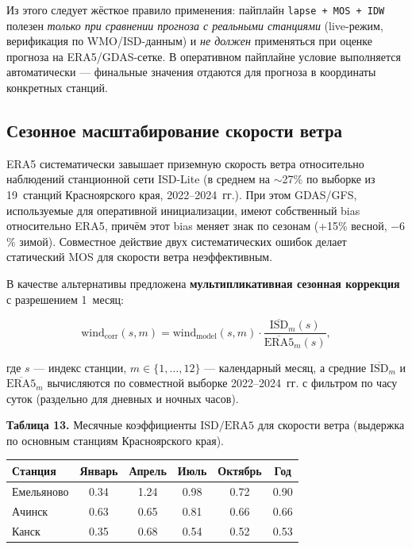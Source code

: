 \documentclass[14pt,a4paper]{extarticle}
\newcounter{none}
\numberwithin{table}{section}
\numberwithin{figure}{section}
\numberwithin{equation}{section}
\begin{document}
Из этого следует жёсткое правило применения: пайплайн
\texttt{lapse + MOS + IDW} полезен \emph{только при сравнении прогноза
с реальными станциями} (live-режим, верификация по WMO/ISD-данным) и
\emph{не должен} применяться при оценке прогноза на ERA5/GDAS-сетке.
В оперативном пайплайне условие выполняется автоматически --- финальные
значения отдаются для прогноза в координаты конкретных станций.

\subsection{Сезонное масштабирование скорости ветра}\label{ux441ux435ux437ux43eux43dux43dux43eux435-ux43cux430ux441ux448ux442ux430ux431ux438ux440ux43eux432ux430ux43dux438ux435-ux432ux435ux442ux440ux430}

ERA5 систематически завышает приземную скорость ветра относительно
наблюдений станционной сети ISD-Lite (в среднем на \(\sim\)27\% по
выборке из 19~станций Красноярского края, 2022--2024~гг.). При этом
GDAS/GFS, используемые для оперативной инициализации, имеют собственный
bias относительно ERA5, причём этот bias меняет знак по сезонам
(+15\% весной, \(-6\)\% зимой). Совместное действие двух систематических
ошибок делает статический MOS для скорости ветра неэффективным.

В качестве альтернативы предложена \textbf{мультипликативная сезонная
коррекция} с разрешением 1~месяц:

\[
\text{wind}_{\text{corr}}(s, m) = \text{wind}_{\text{model}}(s, m) \cdot
\frac{\overline{\text{ISD}}_m(s)}{\overline{\text{ERA5}}_m(s)},
\]

где \(s\) --- индекс станции, \(m \in \{1, \dots, 12\}\) --- календарный
месяц, а средние \(\overline{\text{ISD}}_m\) и
\(\overline{\text{ERA5}}_m\) вычисляются по совместной выборке
2022--2024~гг. с фильтром по часу суток (раздельно для дневных и ночных
часов).

\textbf{Таблица 13.} Месячные коэффициенты \(\text{ISD}/\text{ERA5}\)
для скорости ветра (выдержка по основным станциям Красноярского края).

{\def\LTcaptype{none}
\begin{longtable}[]{@{}lccccc@{}}
\toprule\noalign{}
Станция & Январь & Апрель & Июль & Октябрь & Год \\
\midrule\noalign{}
\endhead
\bottomrule\noalign{}
\endlastfoot
Емельяново & 0.34 & 1.24 & 0.98 & 0.72 & 0.90 \\
Ачинск & 0.63 & 0.65 & 0.81 & 0.66 & 0.66 \\
Канск & 0.35 & 0.68 & 0.54 & 0.52 & 0.53 \\
\end{longtable}
}
\end{document}
